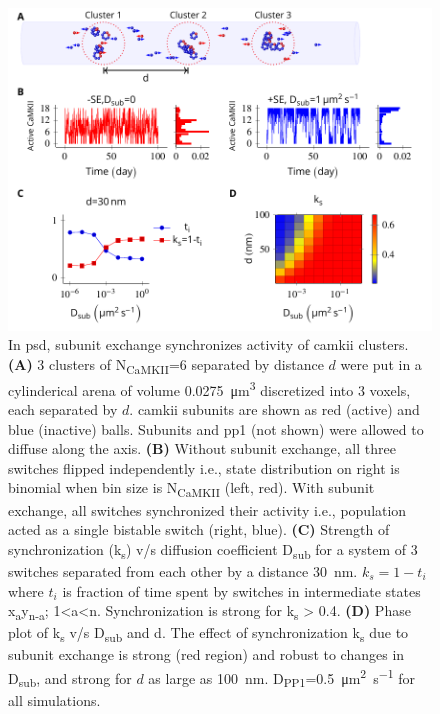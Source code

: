\documentclass[9pt,lineno]{elife}
\newcommand\SUB[2]{#1\textsubscript{#2}}
\begin{document}
\begin{figure}%
    \includegraphics[width=0.9\linewidth]{./PaperFigures/elifeFigure5/figure_sync_150mm.pdf}
    \caption{In \gls{psd}, subunit exchange synchronizes activity of
        \gls{camkii} clusters. \textbf{(A)} 3 clusters of N\textsubscript{CaMKII}=6 
        separated by distance \(d\) were put in a cylinderical arena
        of volume \SI{0.0275}{\micro\meter^3} discretized into 3 voxels, each
        separated by \(d\). \Gls{camkii} subunits are shown as red (active) and
        blue (inactive) balls. Subunits and \gls{pp1} (not shown) were allowed to diffuse along
        the axis. \textbf{(B)} Without subunit exchange, all three switches
        flipped independently i.e., state distribution on right is binomial when bin size is \SUB{N}{CaMKII}
        (left, red). With subunit exchange, all switches synchronized their activity
        i.e., population acted as a single bistable switch (right, blue).  \textbf{(C)}
        Strength of synchronization (k\textsubscript{s}) v/s diffusion
        coefficient \SUB{D}{sub} for a system of 3 switches separated from each
        other by a distance \SI{30}{\nano \meter}.
        $k_s=1-t_i$ where $t_i$ is fraction of time
        spent by switches in intermediate states
        x\textsubscript{a}y\textsubscript{n-a}; 1\textless{}a\textless{}n.
        Synchronization is strong for k\textsubscript{s} \textgreater{} 0.4.
        \textbf{(D)} Phase plot of \SUB{k}{s} v/s \SUB{D}{sub} and d. The effect
        of synchronization \SUB{k}{s} due to subunit exchange is strong (red
        region) and robust to changes in \SUB{D}{sub}, and strong for $d$ as large as
        \SI{100}{\nano\meter}. \SUB{D}{PP1}=\SI{0.5}{\micro\meter\squared\per\second}
        for all simulations.}\label{fig:sync_spread}
\end{figure}
\end{document}
